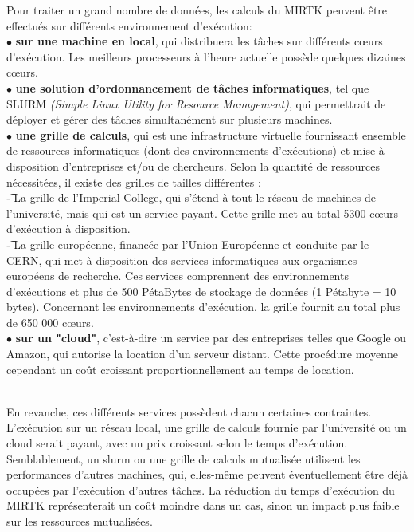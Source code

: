 \documentclass[10pt]{report}
\begin{document}
	Pour traiter un grand nombre de données, les calculs du MIRTK peuvent être effectués sur différents environnement d'exécution:
	\\{$\bullet$}\textbf{ sur une machine en local}, 
	qui distribuera les tâches sur différents cœurs d'exécution. Les meilleurs processeurs à l'heure actuelle possède quelques dizaines cœurs.  
	\\{$\bullet$}\textbf{ une solution d'ordonnancement de tâches informatiques}, tel que SLURM \textit{(Simple Linux Utility for Resource Management)}, qui permettrait de déployer et gérer des tâches simultanément sur plusieurs machines. 
	\\{$\bullet$}\textbf{ une grille de calculs}, qui est une infrastructure virtuelle fournissant ensemble de ressources informatiques (dont des environnements d'exécutions) et mise à disposition d'entreprises et/ou de chercheurs. Selon la quantité de ressources nécessitées, il existe des grilles de tailles différentes : \\
	\t - La grille de l'Imperial College, qui s'étend à tout le réseau de machines de l'université, mais qui est un service payant. Cette grille met au total 5300 cœurs d'exécution à disposition.\\
	\t - La grille européenne, financée par l'Union Européenne et conduite par le CERN, qui met à disposition des services informatiques aux organismes européens de recherche. Ces services comprennent des environnements d'exécutions et plus de 500 PétaBytes de stockage de données (1 Pétabyte = 10 bytes). Concernant les environnements d'exécution, la grille fournit au total plus de 650 000 cœurs.
	\\{$\bullet$}\textbf{ sur un "cloud"}, c'est-à-dire un service par des entreprises telles que Google ou Amazon, qui autorise la location d'un serveur distant. Cette procédure moyenne cependant un coût croissant proportionnellement au temps de location.\\ ~\par
	En revanche, ces différents services possèdent chacun certaines contraintes. L'exécution sur un réseau local, une grille de calculs fournie par l'université ou un cloud serait payant, avec un prix croissant selon le temps d'exécution. Semblablement, un slurm ou une grille de calculs mutualisée utilisent les performances d'autres machines, qui, elles-même peuvent éventuellement être déjà occupées par l'exécution d'autres tâches. La réduction du temps d'exécution du MIRTK représenterait un coût moindre dans un cas, sinon un impact plus faible sur les ressources mutualisées.\\ ~\par
\end{document}

